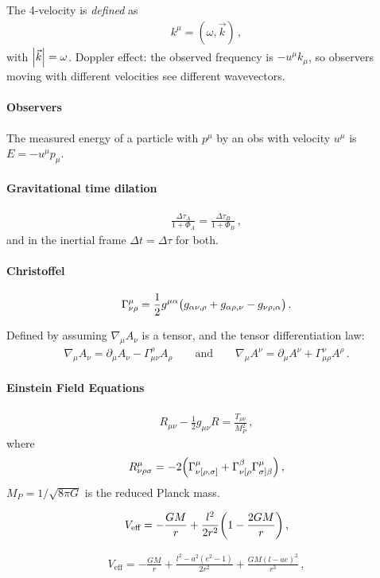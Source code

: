 \documentclass[main.tex]{subfiles}
\begin{document}
The 4-velocity is \emph{defined} as 
%
\begin{align}
k^{\mu } = (\omega , \vec{k})
\,,
\end{align}
%
with \(\abs{\vec{k}} = \omega \). 
Doppler effect: the observed frequency is \(-u^{\mu } k_{\mu }\), so observers moving with different velocities see different wavevectors.

\paragraph{Observers}

The measured energy of a particle with \(p^{\mu }\) by an obs with velocity \(u^{\mu }\) is \(E = - u^{\mu } p_{\mu }\). 

\paragraph{Gravitational time dilation}

\begin{align}
\frac{\Delta \tau _A}{ 1 + \Phi_{A}}
=\frac{\Delta \tau _B}{ 1 + \Phi_{B}}
\,,
\end{align}
%
and in the inertial frame \(\Delta t = \Delta \tau \) for both.

\paragraph{Christoffel}

\begin{align}
\Gamma^{\mu }_{\nu \rho } = \frac{1}{2} g^{\mu \alpha }
\qty(g_{\alpha \nu , \rho } + g_{\alpha \rho , \nu } - g_{\nu \rho , \alpha })
\,.
\end{align}

Defined by assuming \(\nabla_{\mu } A_{\nu }\) is a tensor, and the tensor differentiation law: 
%
\begin{align}
\nabla_{\mu } A_{\nu } = 
\partial_{\mu } A_{\nu } 
- \Gamma^{\rho }_{\mu \nu } A_{\rho }
\qquad \text{and} \qquad
\nabla_{\mu } A^{\nu } =
\partial_{\mu } A^{ \nu } 
+ \Gamma^{\nu }_{\mu \rho } A^{\rho }
\,.
\end{align}

\paragraph{Einstein Field Equations}

%
\begin{align}
R_{\mu \nu } - \frac{1}{2} g_{\mu \nu } R = \frac{T_{\mu \nu } }{M_P^2}
\,,
\end{align}
%
where 
%
\begin{align}
R_{\nu \rho \sigma }^{\mu } = -2 \qty(\Gamma^{\mu }_{\nu [\rho , \sigma ]}  + \Gamma^{\beta }_{\nu [\rho } \Gamma^{\mu }_{\sigma ] \beta })
\,,
\end{align}
%
\(M_P = 1 / \sqrt{8 \pi G}\) is the reduced Planck mass.



%
\begin{align}
V _{\text{eff}} = - \frac{GM}{r} + \frac{l^2}{2 r^2} \qty(1 - \frac{2GM}{r})
\,,
\end{align}
%

%
\begin{align}
V _{\text{eff}} = - \frac{GM}{r} + \frac{l^2- a^2 (e^2-1)}{2 r^2} 
+ \frac{GM (l - ae)^2}{r^3} 
\,,
\end{align}
%
\end{document}
